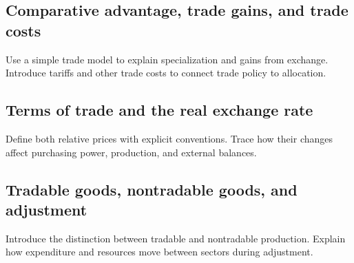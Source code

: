 \label{sec:trade}

\subsection{Comparative advantage, trade gains, and trade costs}
Use a simple trade model to explain specialization and gains from exchange.
Introduce tariffs and other trade costs to connect trade policy to allocation.

\subsection{Terms of trade and the real exchange rate}
Define both relative prices with explicit conventions. Trace how their changes
affect purchasing power, production, and external balances.

\subsection{Tradable goods, nontradable goods, and adjustment}
Introduce the distinction between tradable and nontradable production.
Explain how expenditure and resources move between sectors during adjustment.
